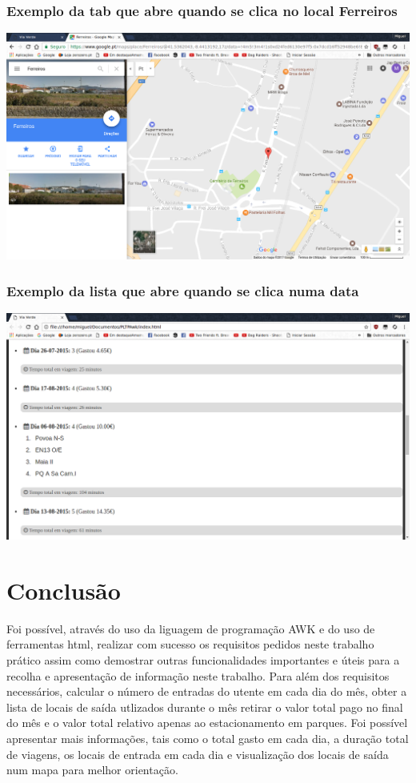 \documentclass{report}
\begin{document}
\subsection{Exemplo da tab que abre quando se clica no local Ferreiros}

\includegraphics[scale=0.35]{maps.png}\par

\subsection{Exemplo da lista que abre quando se clica numa data}

\includegraphics[scale=0.35]{out5.png}\par

\chapter{Conclusão} \label{concl}
Foi possível, 
através do uso da liguagem de programação AWK e do uso de ferramentas html, realizar com sucesso os 
requisitos pedidos neste trabalho prático assim como demostrar outras funcionalidades importantes e úteis para a 
recolha e apresentação de informação neste trabalho.
Para além dos requisitos necessários, calcular o número de entradas do utente em cada dia do mês, obter a 
lista de locais de saída utlizados durante o mês
retirar o valor total pago no final do mês e o valor total relativo apenas ao estacionamento em parques. 
Foi possível apresentar mais informações, tais como
o total gasto em cada dia, a duração total de viagens, os locais de entrada em cada dia e visualização dos locais de saída num mapa para melhor orientação.\par
\end{document}
